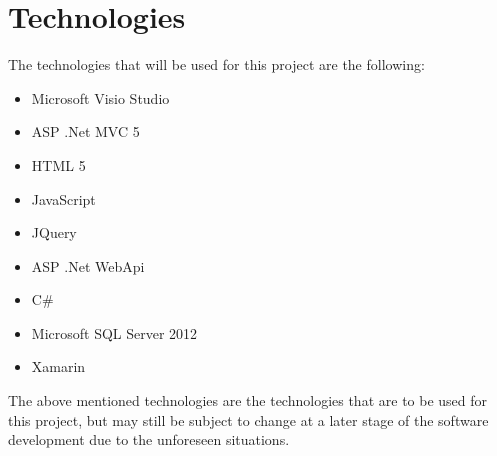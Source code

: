 \documentclass[11pt,titlepage]{article} %
\begin{document}
\section{Technologies}
The technologies that will be used  for this project are the following:
\begin{itemize}
	\item{Microsoft Visio Studio}
	\item{ASP .Net MVC 5}
	\item{HTML 5}
	\item{JavaScript}
	\item{JQuery}
	\item{ASP .Net WebApi}
	\item{C\#}
	\item{Microsoft SQL Server 2012}
	\item{Xamarin}
	\end{itemize}
The above mentioned technologies are the technologies that are to be used for this project, but may still be subject to change at a later stage of the software development due to the unforeseen situations. 
\end{document}
